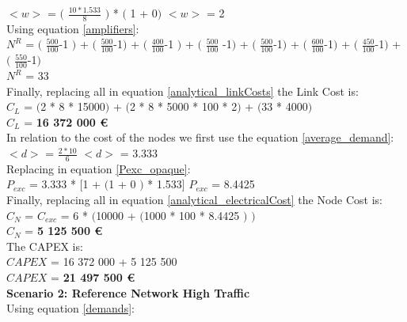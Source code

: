 $<w>$ = $($ $\frac{10 * 1.533}{8}$ $)$ * $($ 1 + 0$)$ \qquad \qquad $<w>$ = 2\\

Using equation \ref{amplifiers}:\\

$N^R$ = $($ $\frac{500}{100}$-1 $)$ + $($ $\frac{500}{100}$-1$)$ + $($ $\frac{400}{100}$-1 $)$ + $($ $\frac{500}{100}$ -1$)$ + $($ $\frac{500}{100}$-1$)$ + $($ $\frac{600}{100}$-1$)$ + $($ $\frac{450}{100}$-1$)$ + $($ $\frac{550}{100}$-1$)$\\

$N^R$ = 33\\

Finally, replacing all in equation \ref{analytical_linkCosts} the Link Cost is:\\

$C_L$ = $($2 * 8 * 15000$)$ + $($2 * 8 * 5000 * 100 * 2$)$ + $($33 * 4000$)$\\

$C_L$ = \textbf{16 372 000 \euro}\\

In relation to the cost of the nodes we first use the equation \ref{average_demand}:\\

$<d>$ = $\frac{2 * 10}{6}$ \qquad \qquad $<d>$ = 3.333\\

Replacing in equation \ref{Pexc_opaque}:\\

$P_{exc}$ = 3.333 * $[$1 + $($1 + $0$ $)$ * 1.533$]$ \qquad \quad $P_{exc}$ = 8.4425 \\

Finally, replacing all in equation \ref{analytical_electricalCost} the Node Cost is:\\

$C_N$ = $C_{exc}$ = 6 * $($10000 + $($1000 * 100 * 8.4425 $)$ $)$\\

$C_N$ = \textbf{5 125 500 \euro}\\

The CAPEX is:\\
$CAPEX$ = 16 372 000 + 5 125 500\\

$CAPEX$ = \textbf{21 497 500 \euro}\\

\textbf{Scenario 2: Reference Network High Traffic}\\

Using equation \ref{demands}:\\

